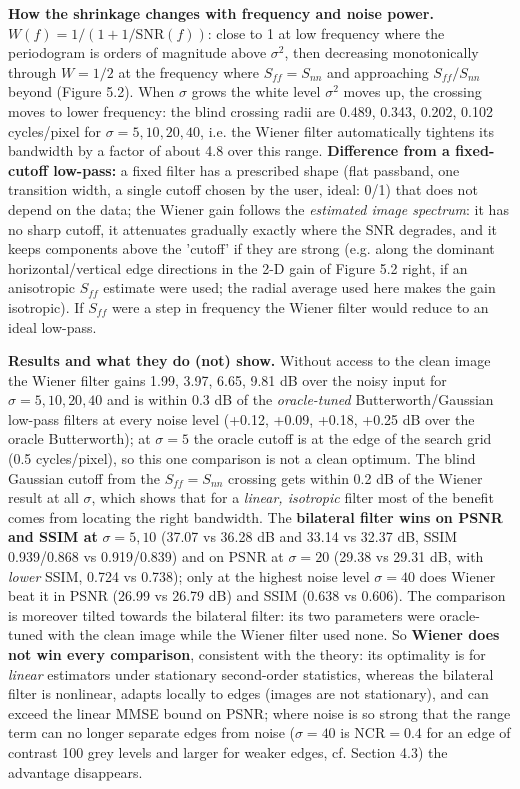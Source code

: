 \documentclass[10pt,a4paper]{article}
\begin{document}
\textbf{How the shrinkage changes with frequency and noise power.} $W(f)=1/(1+1/\mathrm{SNR}(f))$: close to 1 at low frequency where the periodogram is orders of magnitude above $\sigma^2$, then decreasing monotonically through $W=1/2$ at the frequency where $S_{ff}=S_{nn}$ and approaching $S_{ff}/S_{nn}$ beyond (Figure 5.2). When $\sigma$ grows the white level $\sigma^2$ moves up, the crossing moves to lower frequency: the blind crossing radii are 0.489, 0.343, 0.202, 0.102 cycles/pixel for $\sigma=5,10,20,40$, i.e. the Wiener filter automatically tightens its bandwidth by a factor of about 4.8 over this range. \textbf{Difference from a fixed-cutoff low-pass:} a fixed filter has a prescribed shape (flat passband, one transition width, a single cutoff chosen by the user, ideal: 0/1) that does not depend on the data; the Wiener gain follows the \textit{estimated image spectrum}: it has no sharp cutoff, it attenuates gradually exactly where the SNR degrades, and it keeps components above the 'cutoff' if they are strong (e.g. along the dominant horizontal/vertical edge directions in the 2-D gain of Figure 5.2 right, if an anisotropic $S_{ff}$ estimate were used; the radial average used here makes the gain isotropic). If $S_{ff}$ were a step in frequency the Wiener filter would reduce to an ideal low-pass.

\textbf{Results and what they do (not) show.} Without access to the clean image the Wiener filter gains 1.99, 3.97, 6.65, 9.81 dB over the noisy input for $\sigma=5,10,20,40$ and is within 0.3 dB of the \textit{oracle-tuned} Butterworth/Gaussian low-pass filters at every noise level (+0.12, +0.09, +0.18, +0.25 dB over the oracle Butterworth); at $\sigma=5$ the oracle cutoff is at the edge of the search grid (0.5 cycles/pixel), so this one comparison is not a clean optimum. The blind Gaussian cutoff from the $S_{ff}=S_{nn}$ crossing gets within 0.2 dB of the Wiener result at all $\sigma$, which shows that for a \textit{linear, isotropic} filter most of the benefit comes from locating the right bandwidth. The \textbf{bilateral filter wins on PSNR and SSIM at }$\sigma=5,10$ (37.07 vs 36.28 dB and 33.14 vs 32.37 dB, SSIM 0.939/0.868 vs 0.919/0.839) and on PSNR at $\sigma=20$ (29.38 vs 29.31 dB, with \textit{lower} SSIM, 0.724 vs 0.738); only at the highest noise level $\sigma=40$ does Wiener beat it in PSNR (26.99 vs 26.79 dB) and SSIM (0.638 vs 0.606). The comparison is moreover tilted towards the bilateral filter: its two parameters were oracle-tuned with the clean image while the Wiener filter used none. So \textbf{Wiener does not win every comparison}, consistent with the theory: its optimality is for \textit{linear} estimators under stationary second-order statistics, whereas the bilateral filter is nonlinear, adapts locally to edges (images are not stationary), and can exceed the linear MMSE bound on PSNR; where noise is so strong that the range term can no longer separate edges from noise ($\sigma=40$ is $\mathrm{NCR}=0.4$ for an edge of contrast 100 grey levels and larger for weaker edges, cf. Section 4.3) the advantage disappears.
\end{document}
